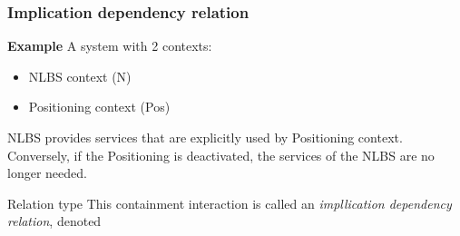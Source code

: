 \documentclass{beamer}
\begin{document}
\begin{frame}[noframenumbering]
	\frametitle{Implication dependency relation}

	\textbf{Example} A system with 2 contexts:

	\begin{itemize}
		\item NLBS context (N)
		\item Positioning context (Pos)
	\end{itemize}

	NLBS provides services that are explicitly used by Positioning context.
	Conversely, if the Positioning is deactivated, the services of the NLBS
	are no longer needed.

	\begin{exampleblock}{Relation type}
		This containment interaction is called an \textit{impllication
		dependency relation}, denoted 
	\end{exampleblock}
\end{frame}
\end{document}
